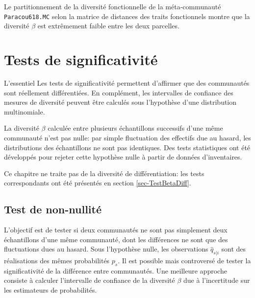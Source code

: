 \documentclass[
  11pt,
  french,
  a4paper,
  extrafontsizes,onecolumn,openright
  ]{memoir}
\newenvironment{Summary}
  {\begin{bclogo}[logo=\bctrombone, noborder=true, couleur=lightgray!50]{L'essentiel}\parindent0pt}
  {\end{bclogo}}
\begin{document}
\normalsize

Le partitionnement de la diversité fonctionnelle de la méta-communauté \texttt{Paracou618.MC} selon la matrice de distances des traits fonctionnels montre que la diversité \(\beta\) est extrêmement faible entre les deux parcelles.

\hypertarget{tests-de-significativituxe9}{%
\chapter{Tests de significativité}\label{tests-de-significativituxe9}}

\scriptsize

\begin{Summary}
Les tests de significativité permettent d'affirmer que des communautés
sont réellement différentiées. En complément, les intervalles de
confiance des mesures de diversité peuvent être calculés sous
l'hypothèse d'une distribution multinomiale.
\end{Summary}

\normalsize

La diversité \(\beta\) calculée entre plusieurs échantillons successifs d'une même communauté n'est pas nulle: par simple fluctuation des effectifs due au hasard, les distributions des échantillons ne sont pas identiques.
Des tests statistiques ont été développés pour rejeter cette hypothèse nulle à partir de données d'inventaires.

Ce chapitre ne traite pas de la diversité de différentiation: les tests correspondants ont été présentés en section \ref{sec-TestBetaDiff}.

\hypertarget{test-de-non-nullituxe9-1}{%
\section{Test de non-nullité}\label{test-de-non-nullituxe9-1}}

L'objectif est de tester si deux communautés ne sont pas simplement deux échantillons d'une même communauté, dont les différences ne sont que des fluctuations dues au hasard.
Sous l'hypothèse nulle, les observations \(\hat{q}_{s|i}\) sont des réalisations des mêmes probabilités \(p_s\).
Il est possible \autocite{Crist2003} mais controversé \autocite{Jones1986} de tester la significativité de la différence entre communautés.
Une meilleure approche consiste à calculer l'intervalle de confiance de la diversité \(\beta\) due à l'incertitude sur les estimateurs de probabilités.
\end{document}
